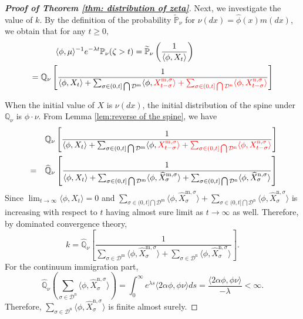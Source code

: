 \documentclass[12pt,a4paper]{amsart}
\theoremstyle{plain}
\theoremstyle{definition}
\numberwithin{equation}{section}
\begin{document}
\begin{proof}[{\bf Proof of Theorem \ref{thm: distribution of zeta}}]
	Next, we investigate the value of $k$.  By the definition of the probability $\widetilde{\mathbb P}_\nu$ for $\nu(dx)=\hat\phi(x)m(dx)$, we obtain that for any $t\ge 0,$
\begin{align}\label{subcritical equality}
 	\langle\phi,\mu\rangle ^{-1}e^{-\lambda t}\mathbb P_\nu(\zeta>t)=\widetilde{\mathbb P}_\nu\left(\frac{1}{\langle\phi, X_{t}\rangle }\right)\hspace*{3.4 true cm}\\
 	=\mathbb Q_{\nu}\left[\frac{1}{\langle\phi, X_{t}\rangle +\sum_{\sigma\in(0, t]\bigcap\mathcal D^{\mathrm m}}\langle \phi, {\color{red}X_{t-\sigma}^{{\mathrm m},\sigma}\rangle +\sum_{\sigma\in (0, t]\bigcap \mathcal D^{\mathrm n}}\langle \phi, X_{t-\sigma}^{{\mathrm n}, \sigma}\rangle} }\right]
\end{align}

	When the initial value of $X$ is $\nu(dx)$, the initial distribution of the spine under $\mathbb Q_\nu$ is $\phi\cdot\nu$.
	From Lemma \ref{lem:reverse of the spine}, we have
\begin{eqnarray*}\label{duality}
    &&  \mathbb Q_{\nu}\left[\frac{1}{\langle\phi, X_{t}\rangle +\sum_{\sigma\in(0, t]\bigcap\mathcal D^{\mathrm m}}\langle \phi,{\color{red} X_{t-\sigma}^{{\mathrm m},\sigma}\rangle +\sum_{\sigma\in (0, t]\bigcap \mathcal D^{\mathrm n}}\langle \phi, X_{t-\sigma}^{{\mathrm n}, \sigma}\rangle} }\right]\\
    &=&\widehat{\mathbb Q}_{\nu}\left[\frac{1}{\langle\phi, X_{t}\rangle +\sum_{\sigma\in(0, t]\bigcap\mathcal D^{\mathrm m}}\langle \phi, \widehat X_{\sigma}^{{\mathrm m},\sigma}\rangle +\sum_{\sigma\in (0, t]\bigcap \mathcal D^{\mathrm n}}\langle \phi, \widehat X_{\sigma}^{{\mathrm n},\sigma}\rangle }\right]
\end{eqnarray*}
    Since $\lim_{t\to\infty}\langle\phi, X_{t}\rangle=0$ and $\sum_{\sigma\in(0, t]\bigcap\mathcal D^{\mathrm m}}\langle \phi, \widehat X_{\sigma}^{{\mathrm m},\sigma}\rangle +\sum_{\sigma\in (0, t]\bigcap \mathcal D^{\mathrm n}}\langle \phi, \widehat X_{\sigma}^{{\mathrm n},\sigma}\rangle $ is increasing with respect to $t$ having almost sure limit as $t\to\infty$ as well.  Therefore, by dominated convergence theory,
\begin{equation}\label{cons}
	k=\widehat{\mathbb Q}_{\nu}\left[\frac{1}{\sum_{\sigma\in\mathcal D^{\mathrm m}}\langle \phi, \widehat X_{\sigma}^{{\mathrm m},\sigma}\rangle +\sum_{\sigma\in \mathcal D^{\mathrm n}}\langle \phi, \widehat X_{\sigma}^{{\mathrm n},\sigma}\rangle }\right].
\end{equation}
	For the continuum immigration part,
\[
	\widehat{\mathbb Q}_{\nu}\left(\sum_{\sigma\in \mathcal D^{\mathrm n}}\langle \phi, \widehat X_{\sigma}^{{\mathrm n},\sigma}\rangle \right)=\int_0^\infty e^{\lambda s}\langle 2\alpha\phi, \phi\nu\rangle  ds=\frac{\langle 2\alpha\phi, \phi\nu\rangle}{-\lambda}<\infty.
\]
	Therefore, $\sum_{\sigma\in \mathcal D^{\mathrm n}}\langle \phi, \widehat X_{\sigma}^{{\mathrm n},\sigma}\rangle$ is finite almost surely.


\end{proof}
\end{document}
